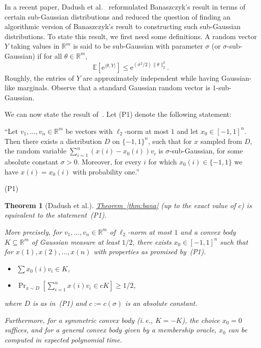 \documentclass[11pt]{article}
\numberwithin{equation}{section}
\newtheorem{theorem}{Theorem}[section]
\theoremstyle{definition}
\theoremstyle{plain}
\newcommand{\R}{\mathbb R}
\newcommand{\eee}{\mathrm e}
\newcommand{\ie}{i.\,e.}
\newcommand{\expref}[2]{\hyperref[#2]{#1~\ref{#2}}}
\newcommand\E{\mathbb{E}}
\begin{document}
In a recent
%
paper,     %
Dadush et al.~\cite{DGLN16} reformulated Banaszczyk's result in
terms of
certain sub-Gaussian distributions and reduced the question of finding an
algorithmic version of Banaszczyk's result to constructing such sub-Gaussian
distributions. To state this result, we first need some definitions. A random
vector $Y$ taking values in $\mathbb{R}^m$ is said to be sub-Gaussian with
parameter $\sigma$ (or $\sigma$-sub-Gaussian) if for all $\theta\in \mathbb{R}^{m}$,
\[
  \E\left[ \eee^{\langle \theta,Y\rangle }  \right] \le  \eee^{(\sigma^2/2)\| \theta \|_2^2}.
\]
Roughly, the entries of $Y$ are approximately independent while having Gaussian-like marginals.
Observe that a standard Gaussian random vector is $1$-sub-Gaussian.


We can now state the result
%
of~\cite{DGLN16}.
Let (P1) denote the following statement: \\

\begin{minipage}{35em}
%
\flushleft
``Let $v_1,\ldots,v_n \in \R^m$ be vectors with $\ell_2$-norm at most $1$ and let
$x_0\in[-1,1]^n$. Then there exists a distribution $D$ on $\{-1,1\}^n$,
such that for $x$ sampled from $D$, the random variable $\sum_{i=1}^n (x(i)-x_0(i)) v_i$ is
$\sigma$-sub-Gaussian, for some absolute constant $\sigma>0$.
Moreover, for every $i$ for which $x_0(i) \in \{-1,1\}$ we have $x(i)=x_0(i)$ with probability one.''\\
\end{minipage}
\begin{minipage}{4em}
\flushright
(P1)\\
\end{minipage}

\bigskip

%
\begin{theorem}[Dadush et al.]\label{thm:subgaussian}     %
\expref{Theorem}{thm:bana} (up to the exact value of $c$) is equivalent to
the statement~(P1).

More precisely, for $v_1,\dots,v_n \in \R^m$ of $\ell_2$-norm at most $1$ and a convex body $K
\subseteq \R^m$ of Gaussian measure at least $1/2$, there exists $x_0 \in
[-1,1]^n$ such that for $x(1), x(2), \ldots, x(n)$ with properties as promised by~(P1).
\begin{itemize}
\item[(i)] $\sum x_0(i) v_i \in K$,
\item[(ii)] $\Pr_{x \sim D}[\sum_{i=1}^n x(i) v_i \in cK] \ge 1/2$,
\end{itemize}
where $D$ is as in~(P1) and $c := c(\sigma)$ is an absolute constant.

Furthermore, for a symmetric convex body (\ie, $K=-K$), the choice $x_0 = 0$
suffices, and for a general convex body given by a membership oracle, $x_0$ can
be computed in expected polynomial time.
\end{theorem}
\end{document}
